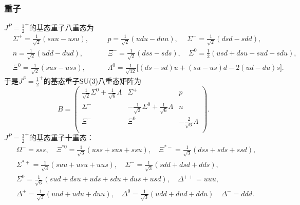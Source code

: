 \subsubsection{重子}
$J^{P}=\frac{1}{2}^{+}$的基态重子八重态为
\begin{equation}
\label{baryon quark}
\begin{aligned}
	&\Sigma^{+}=\frac{1}{\sqrt{2}}(suu-usu),&\quad& p=\frac{1}{\sqrt{2}}(udu-duu),\quad \ \Sigma^{-}=\frac{1}{\sqrt{2}}(dsd-sdd),\\[2ex]
	&n=\frac{1}{\sqrt{2}}(udd-dud),&\quad& \Xi^{-}=\frac{1}{\sqrt{2}}(dss-sds),\quad\Sigma^{0}=\frac{1}{2}(usd+dsu-sud-sdu),\\[2ex]
	&\Xi^{0}=\frac{1}{\sqrt{2}}(sus-uss),&\quad&\Lambda^{0}=\frac{1}{\sqrt{12}}\big[(ds-sd)u+(su-us)d-2(ud-du)s\big].
\end{aligned}
\end{equation}
于是$J^{P}=\frac{1}{2}^{+}$的基态重子SU(3)八重态矩阵为
\begin{equation}
\label{baryon8}
	B=
	\begin{pmatrix}
		\frac{1}{\sqrt{2}}\Sigma^{0}+\frac{1}{\sqrt{6}}\Lambda & \Sigma^{+}&p  \\
		\Sigma^{-} & -\frac{1}{\sqrt{2}}\Sigma^{0}+\frac{1}{\sqrt{6}}\Lambda & n \\
		\Xi^{-} & \Xi^{0} & -\frac{2}{\sqrt{6}}\Lambda \\
	\end{pmatrix}.
\end{equation}
$J^{P}=\frac{3}{2}^{+}$的基态重子十重态：
\begin{equation}
\begin{aligned}
	&\Omega^{-}=sss,\quad \Xi^{*0}=\frac{1}{\sqrt{3}}(uss+sus+ssu),\quad \Xi^{*-}=\frac{1}{\sqrt{3}}(dss+sds+ssd),\\[2ex]
	&\Sigma^{*+}=\frac{1}{\sqrt{3}}(suu+usu+uus),\quad \Sigma^{-}=\frac{1}{\sqrt{3}}(sdd+dsd+dds),\\[2ex]
	&\Sigma^{0}=\frac{1}{\sqrt{6}}(sud+dsu+uds+sdu+dus+usd),\quad\Delta^{++}=uuu,\\[2ex]
	&\Delta^{+}=\frac{1}{\sqrt{3}}(uud+udu+duu),\quad\Delta^{0}=\frac{1}{\sqrt{3}}(udd+dud+ddu)\quad\Delta^{-}=ddd.
\end{aligned}
\end{equation}

